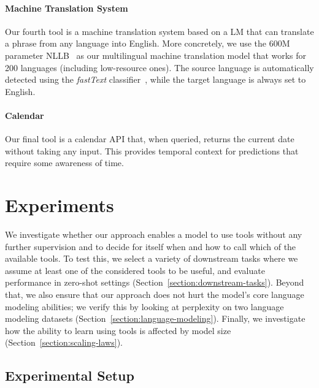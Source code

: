 \documentclass[11pt]{article}
\begin{document}
\begin{CJK*}{UTF8}{gbsn}
\paragraph{Machine Translation System} Our fourth tool is a machine translation system based on a LM that can translate a phrase from any language into English. More concretely, we use the 600M parameter NLLB~\citep{costa2022no} as our multilingual machine translation model that works for 200 languages (including low-resource ones). The source language is automatically detected using the \textit{fastText} classifier~\citep{joulin2016fasttext}, while the target language is always set to English. 

\paragraph{Calendar}
Our final tool is a calendar API that, when queried, returns the current date without taking any input. This provides temporal context for predictions that require some awareness of time.

\section{Experiments}

We investigate whether our approach enables a model to use tools without any further supervision and to decide for itself when and how to call which of the available tools. To test this, we select a variety of downstream tasks where we assume at least one of the considered tools to be useful, and evaluate performance in zero-shot settings (Section~\ref{section:downstream-tasks}). Beyond that, we also ensure that our approach does not hurt the model's core language modeling abilities; we verify this by looking at perplexity on two language modeling datasets (Section~\ref{section:language-modeling}). Finally, we investigate how the ability to learn using tools is affected by model size (Section~\ref{section:scaling-laws}).

\subsection{Experimental Setup} 
\label{section:experimental-setup}


\end{CJK*}
\end{document}

